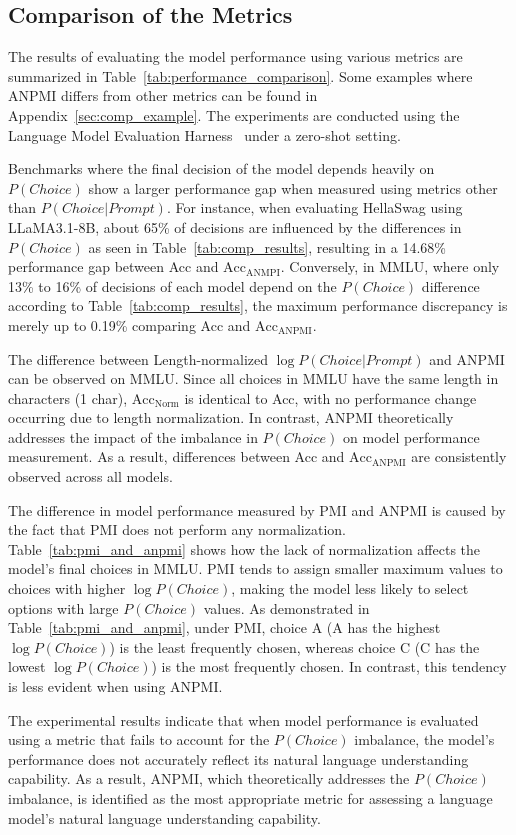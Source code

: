 \subsection{Comparison of the Metrics}
The results of evaluating the model performance using various metrics are summarized in Table~\ref{tab:performance_comparison}. {Some examples where ANPMI differs from other metrics can be found in Appendix\mbox{~\ref{sec:comp_example}}.} The experiments are conducted using the Language Model Evaluation Harness~\cite{eval-harness} under a zero-shot setting.  

Benchmarks where the final decision of the model depends heavily on {\small $P(Choice)$} show a larger performance gap when measured using metrics other than {\small $P(Choice|Prompt)$}. 
For instance, when evaluating HellaSwag using LLaMA3.1-8B, about 65\% of decisions are influenced by the differences in {\small $P(Choice)$} as seen in Table~\ref{tab:comp_results}, resulting in a 14.68\% performance gap between Acc and $\text{Acc}_\text{ANMPI}$. Conversely, in MMLU, where only 13\% to 16\% of decisions of each model depend on the {\small $P(Choice)$} difference according to Table~\ref{tab:comp_results}, the maximum performance discrepancy is merely up to 0.19\% comparing Acc and $\text{Acc}_\text{ANPMI}$.

The difference between Length-normalized {\small $\log P(Choice|Prompt)$} and ANPMI can be observed on MMLU. Since all choices in MMLU have the same length in characters (1 char), $\text{Acc}_\text{Norm}$ is identical to Acc, with no performance change occurring due to length normalization. In contrast, ANPMI theoretically addresses the impact of the imbalance in {\small $P(Choice)$} on model performance measurement. As a result, differences between Acc and $\text{Acc}_\text{ANPMI}$ are consistently observed across all models.

The difference in model performance measured by PMI and ANPMI is caused by the fact that PMI does not perform any normalization. Table~\ref{tab:pmi_and_anpmi} shows how the lack of normalization affects the model's final choices in MMLU. PMI tends to assign smaller maximum values to choices with higher {\small $\log P(Choice)$}, making the model less likely to select options with large {\small $P(Choice)$} values. As demonstrated in Table~\ref{tab:pmi_and_anpmi}, under PMI, choice A (A has the highest {\small $\log P(Choice)$}) is the least frequently chosen, whereas choice C (C has the lowest {\small $\log P(Choice)$}) is the most frequently chosen. In contrast, this tendency is less evident when using ANPMI.

The experimental results indicate that when model performance is evaluated using a metric that fails to account for the {\small $P(Choice)$} imbalance, the model's performance does not accurately reflect its natural language understanding capability. As a result, ANPMI, which theoretically addresses the {\small $P(Choice)$} imbalance, is identified as the most appropriate metric for assessing a language model's natural language understanding capability.